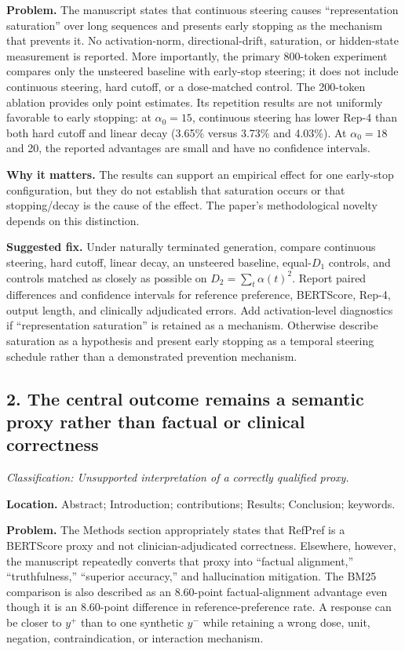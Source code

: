 \documentclass[11pt]{article}
\newcommand{\findinglabel}[1]{\textbf{#1}}
\newcommand{\classification}[1]{\textit{Classification: #1.}}
\begin{document}
\findinglabel{Problem.} The manuscript states that continuous steering causes ``representation saturation'' over long sequences and presents early stopping as the mechanism that prevents it.  No activation-norm, directional-drift, saturation, or hidden-state measurement is reported.  More importantly, the primary 800-token experiment compares only the unsteered baseline with early-stop steering; it does not include continuous steering, hard cutoff, or a dose-matched control.  The 200-token ablation provides only point estimates.  Its repetition results are not uniformly favorable to early stopping: at $\alpha_0=15$, continuous steering has lower Rep-4 than both hard cutoff and linear decay (3.65\% versus 3.73\% and 4.03\%).  At $\alpha_0=18$ and 20, the reported advantages are small and have no confidence intervals.

\findinglabel{Why it matters.} The results can support an empirical effect for one early-stop configuration, but they do not establish that saturation occurs or that stopping/decay is the cause of the effect.  The paper's methodological novelty depends on this distinction.

\findinglabel{Suggested fix.} Under naturally terminated generation, compare continuous steering, hard cutoff, linear decay, an unsteered baseline, equal-$D_1$ controls, and controls matched as closely as possible on $D_2=\sum_t\alpha(t)^2$.  Report paired differences and confidence intervals for reference preference, BERTScore, Rep-4, output length, and clinically adjudicated errors.  Add activation-level diagnostics if ``representation saturation'' is retained as a mechanism.  Otherwise describe saturation as a hypothesis and present early stopping as a temporal steering schedule rather than a demonstrated prevention mechanism.

\subsection*{2. The central outcome remains a semantic proxy rather than factual or clinical correctness}

\classification{Unsupported interpretation of a correctly qualified proxy}

\findinglabel{Location.} Abstract; Introduction; contributions; Results; Conclusion; keywords.

\findinglabel{Problem.} The Methods section appropriately states that RefPref is a BERTScore proxy and not clinician-adjudicated correctness.  Elsewhere, however, the manuscript repeatedly converts that proxy into ``factual alignment,'' ``truthfulness,'' ``superior accuracy,'' and hallucination mitigation.  The BM25 comparison is also described as an 8.60-point factual-alignment advantage even though it is an 8.60-point difference in reference-preference rate.  A response can be closer to $y^+$ than to one synthetic $y^-$ while retaining a wrong dose, unit, negation, contraindication, or interaction mechanism.
\end{document}
